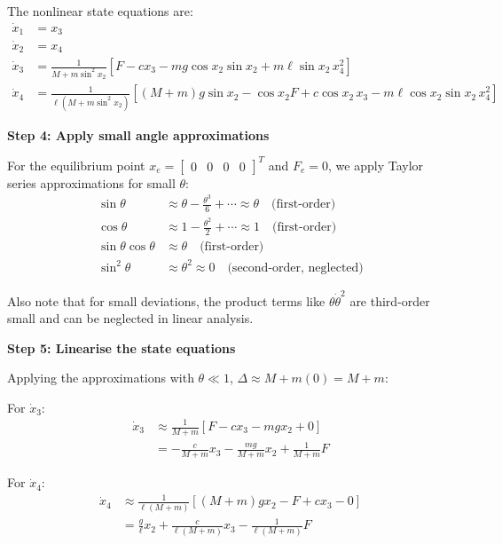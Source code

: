 \documentclass[11pt,a4paper]{article}
\begin{document}
The nonlinear state equations are:
\begin{align}
  \dot{x}_1 &= x_3\\
  \dot{x}_2 &= x_4\\
  \dot{x}_3 &= \frac{1}{M + m\sin^2 x_2}\left[F - c x_3 - mg\cos x_2\sin x_2 + m\ell\sin x_2\,x_4^2\right]\\
  \dot{x}_4 &= \frac{1}{\ell(M+m\sin^2 x_2)}\left[(M+m)g\sin x_2 - \cos x_2 F + c\cos x_2\,x_3 - m\ell\cos x_2\sin x_2\,x_4^2\right]
\end{align}

\textbf{Step 4: Apply small angle approximations}

For the equilibrium point $x_e = \begin{bmatrix} 0 & 0 & 0 & 0 \end{bmatrix}^T$ and $F_e = 0$, we apply Taylor series approximations for small $\theta$:
\begin{align}
  \sin\theta &\approx \theta - \frac{\theta^3}{6} + \cdots \approx \theta \quad \text{(first-order)}\\
  \cos\theta &\approx 1 - \frac{\theta^2}{2} + \cdots \approx 1 \quad \text{(first-order)}\\
  \sin\theta\cos\theta &\approx \theta \quad \text{(first-order)}\\
  \sin^2\theta &\approx \theta^2 \approx 0 \quad \text{(second-order, neglected)}
\end{align}

Also note that for small deviations, the product terms like $\theta\dot{\theta}^2$ are third-order small and can be neglected in linear analysis.

\textbf{Step 5: Linearise the state equations}

Applying the approximations with $\theta \ll 1$, $\Delta \approx M + m(0) = M + m$:

For $\dot{x}_3$:
\begin{align}
  \dot{x}_3 &\approx \frac{1}{M+m}\left[F - cx_3 - mgx_2 + 0\right]\\
  &= -\frac{c}{M+m}x_3 - \frac{mg}{M+m}x_2 + \frac{1}{M+m}F
\end{align}

For $\dot{x}_4$:
\begin{align}
  \dot{x}_4 &\approx \frac{1}{\ell(M+m)}\left[(M+m)gx_2 - F + cx_3 - 0\right]\\
  &= \frac{g}{\ell}x_2 + \frac{c}{\ell(M+m)}x_3 - \frac{1}{\ell(M+m)}F
\end{align}
\end{document}
